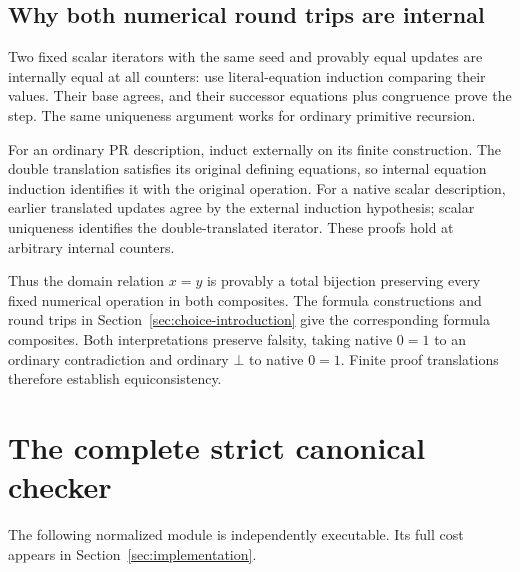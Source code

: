 \documentclass[11pt]{article}
\theoremstyle{definition}
\begin{document}
\subsection{Why both numerical round trips are internal}

Two fixed scalar iterators with the same seed and provably equal
updates are internally equal at all counters: use literal-equation
induction comparing their values. Their base agrees, and their
successor equations plus congruence prove the step. The same
uniqueness argument works for ordinary primitive recursion.

For an ordinary PR description, induct externally on its finite
construction. The double translation satisfies its original
defining equations, so internal equation induction identifies it
with the original operation. For a native scalar description,
earlier translated updates agree by the external induction
hypothesis; scalar uniqueness identifies the double-translated
iterator. These proofs hold at arbitrary internal counters.

Thus the domain relation $x=y$ is provably a total bijection
preserving every fixed numerical operation in both composites.
The formula constructions and round trips in
Section~\ref{sec:choice-introduction} give the corresponding formula
composites. Both interpretations preserve falsity, taking native
$0=1$ to an ordinary contradiction and ordinary $\bot$ to native
$0=1$. Finite proof translations therefore establish equiconsistency.


\clearpage\section{The complete strict canonical checker}

The following normalized module is independently executable. Its full cost appears in Section~\ref{sec:implementation}.
\end{document}
